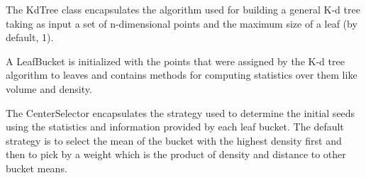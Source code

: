\documentclass[12pt]{article}
\begin{document}
	The KdTree class encapsulates the algorithm used for building a general K-d tree taking as input a set of n-dimensional points and the maximum size of a leaf (by default, 1).
	
	A LeafBucket is initialized with the points that were assigned by the K-d tree algorithm to leaves and contains methods for computing statistics over them like volume and density.
	
	The CenterSelector encapsulates the strategy used to determine the initial seeds using the statistics and information provided by each leaf bucket. The default strategy is to select the mean of the bucket with the highest density first and then to pick by a weight which is the product of density and distance to other bucket means.
	
	
	
	\newpage
	
	
\end{document}
